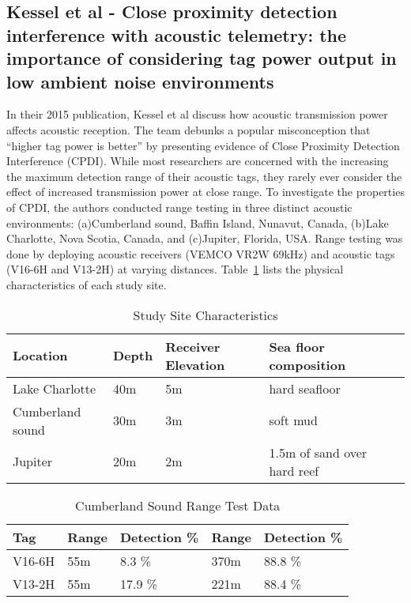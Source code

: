 \subsection{Kessel et al - Close proximity detection interference with acoustic telemetry: the importance of considering tag power output in low ambient noise environments}
In their 2015 publication, Kessel et al\cite{Kessel2015} discuss how acoustic transmission power affects acoustic reception.  The team debunks a popular misconception that ``higher tag power is better'' by presenting evidence of Close Proximity Detection Interference (CPDI).  While most researchers are concerned with the increasing the maximum detection range of their acoustic tags, they rarely ever consider the effect of increased transmission power at close range.  To investigate the properties of CPDI, the authors conducted range testing in three distinct acoustic environments: (a)Cumberland sound, Baffin Island, Nunavut, Canada, (b)Lake Charlotte, Nova Scotia, Canada, and (c)Jupiter, Florida, USA.  Range testing was done by deploying acoustic receivers (VEMCO VR2W 69kHz) and acoustic tags (V16-6H and V13-2H) at varying distances.  Table~\ref{CPDItable} lists the physical characteristics of each study site.

\begin{table}[ht]
	\begin{tabular}{l l l l l}
		Location&Depth&Receiver Elevation&Sea floor composition\\
		\hline
		Lake Charlotte			& 40m	& 5m	& hard seafloor \\
		Cumberland sound		& 30m	& 3m	& soft mud	\\
		Jupiter		& 20m	& 2m	& 1.5m of sand over hard reef\\
	\end{tabular}
	\caption{Study Site Characteristics
		\label{CPDItable}}
\end{table}

\begin{table}[ht]
	\begin{tabular}{l l l l l}
		Tag	&Range	&Detection \%	&Range	&Detection \%\\
		\hline
		V16-6H	&55m	& 8.3 \%		&370m	&88.8 \%\\
		V13-2H	&55m 	& 17.9 \%	&221m	&88.4 \%\\
	\end{tabular}
	\caption{Cumberland Sound Range Test Data
		\label{rangeTestData}}
\end{table}

